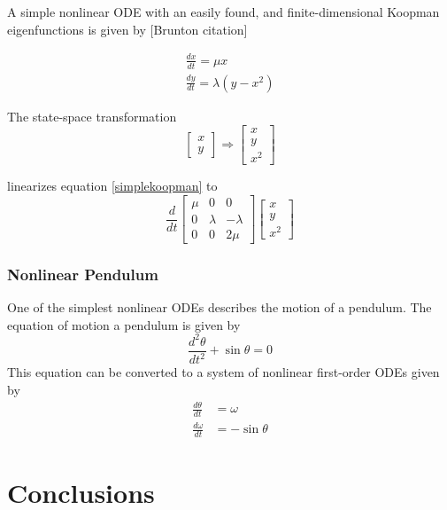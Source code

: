 \documentclass{article}
\begin{document}
A simple nonlinear ODE with an easily found, and finite-dimensional Koopman eigenfunctions is given by [Brunton citation]

\begin{align}
  \label{simplekoopman}
\frac{dx}{dt} = \mu x \\
\frac{dy}{dt} = \lambda(y - x^2)
\end{align}

The state-space transformation
\[ \begin{bmatrix}
x\\
y
\end{bmatrix} \Rightarrow \begin{bmatrix}
x \\
y \\
x^2
\end{bmatrix}
\]

linearizes equation \ref{simplekoopman} to
\[ \frac{d}{dt} \begin{bmatrix}
\mu & 0 & 0 \\
0 & \lambda & -\lambda \\
0 & 0 & 2 \mu
\end{bmatrix} \begin{bmatrix}
x \\
y \\
x^2
\end{bmatrix}
\]







\subsubsection{Nonlinear Pendulum}
One of the simplest nonlinear ODEs describes the motion of a pendulum. The equation of motion a pendulum is given by
\[ \frac{d^2 \theta}{d t^2} + \sin \theta = 0 \]
This equation can be converted to a system of nonlinear first-order ODEs given by
\begin{align*}
\frac{d\theta}{dt} &= \omega \\
\frac{d\omega}{dt} &= -\sin \theta
\end{align*}







\section{Conclusions}




\nocite{langley00}



\end{document}
